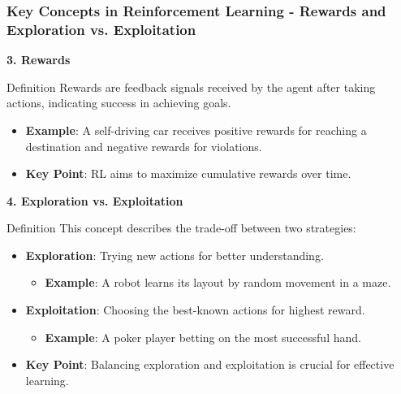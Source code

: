 \documentclass[aspectratio=169]{beamer}
\begin{document}
\begin{frame}[fragile]
  \frametitle{Key Concepts in Reinforcement Learning - Rewards and Exploration vs. Exploitation}
  \textbf{3. Rewards}
  \begin{block}{Definition}
    Rewards are feedback signals received by the agent after taking actions, indicating success in achieving goals.
  \end{block}
  \begin{itemize}
    \item \textbf{Example}: A self-driving car receives positive rewards for reaching a destination and negative rewards for violations.
    \item \textbf{Key Point}: RL aims to maximize cumulative rewards over time.
  \end{itemize}

  \textbf{4. Exploration vs. Exploitation}
  \begin{block}{Definition}
    This concept describes the trade-off between two strategies:
  \end{block}

  \begin{itemize}
    \item \textbf{Exploration}: Trying new actions for better understanding.
      \begin{itemize}
        \item \textbf{Example}: A robot learns its layout by random movement in a maze.
      \end{itemize}
      
    \item \textbf{Exploitation}: Choosing the best-known actions for highest reward.
      \begin{itemize}
        \item \textbf{Example}: A poker player betting on the most successful hand.
      \end{itemize}
    
    \item \textbf{Key Point}: Balancing exploration and exploitation is crucial for effective learning.
  \end{itemize}
\end{frame}
\end{document}
